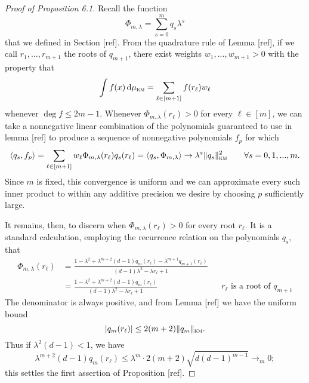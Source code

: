 \begin{proof}[Proof of Proposition 6.1]
    Recall the function
    $$
        \Phi_{m,\lambda} = \sum_{s = 0}^m q_s\lambda^s
    $$
    that we defined in Section [ref]. From the quadrature rule of Lemma [ref], if we call $r_1,...,r_{m+1}$ the roots of $q_{m+1}$, there exist weights $w_1,...,w_{m+1} > 0$ with the property that
    $$
        \int f(x) \,\textup{d} \mu_{\textsc{km}} = \sum_{\ell \in [m+1]} f(r_\ell)w_\ell
    $$
    whenever $\deg f \le 2m - 1$. Whenever $\Phi_{m,\lambda}(r_\ell) > 0$ for every $\ell \in [m]$, we can take a nonnegative linear combination of the polynomials guaranteed to use in lemma [ref] to produce a sequence of nonnegative polynomials $f_p$ for which
    $$
        \langle q_s, f_p \rangle = \sum_{\ell \in [m+1]} w_\ell \Phi_{m,\lambda}(r_\ell) q_s(r_\ell) = \langle q_s,\Phi_{m,\lambda} \rangle \to \lambda^s \|q_s\|^2_{\textsc{km}} \qquad \forall s =0,1,...,m.
    $$
    Since $m$ is fixed, this convergence is uniform and we can approximate every such inner product to within any additive precision we desire by choosing $p$ sufficiently large.
    
    It remains, then, to discern when $\Phi_{m,\lambda}(r_\ell) > 0$ for every root $r_\ell$. It is a standard calculation, employing the recurrence relation on the polynomials $q_s$, that
    \begin{align*}
        \Phi_{m,\lambda}(r_\ell) 
        &= \frac{1 - \lambda^2 + \lambda^{m+2}(d-1)q_m(r_\ell) - \lambda^{m+1}q_{m+1}(r_\ell)}{(d-1)\lambda^2 - \lambda r_\ell + 1} \\
        &= \frac{1 - \lambda^2 + \lambda^{m+2}(d-1)q_m(r_\ell)}{(d-1)\lambda^2 - \lambda r_\ell + 1} & & r_\ell \text{ is a root of } q_{m+1}
    \end{align*}
    The denominator is always positive, and from Lemma [ref] we have the uniform bound
    $$
        |q_m(r_\ell)| \le 2(m + 2)\|q_m\|_{\textsc{km}}.
    $$
    Thus if $\lambda^2(d-1) < 1$, we have
    $$
        \lambda^{m+2}(d-1)q_m(r_\ell) \le \lambda^m \cdot 2(m + 2) \sqrt{d(d-1)^{m-1}} \to_m 0;
    $$
    this settles the first assertion of Proposition [ref].
\end{proof}

